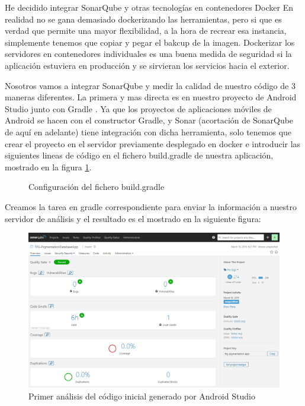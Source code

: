 He decidido integrar SonarQube y otras tecnologías en contenedores Docker \cite{docker} En realidad no se gana demasiado dockerizando las herramientas, pero si que es verdad que permite una mayor flexibilidad, a la hora de recrear esa instancia, simplemente tenemos que copiar y pegar el bakcup de la imagen. Dockerizar los servidores en contenedores individuales es una buena medida de seguridad si la aplicación estuviera en producción y se sirvieran los servicios hacia el exterior. 

Nosotros vamos a integrar SonarQube y medir la calidad de nuestro código de 3 maneras diferentes. La primera y mas directa es en nuestro proyecto de Android Studio junto con Gradle \cite{gradle}. Ya que los proyectos de aplicaciones móviles de Android se hacen con el constructor Gradle, y Sonar (acortación de SonarQube de aquí en adelante) tiene integración con dicha herramienta, solo tenemos que crear el proyecto en el servidor previamente desplegado en docker e introducir las siguientes lineas de código en el fichero build.gradle de nuestra aplicación, mostrado en la figura \ref{fig:buildGradle}.

\begin{figure} \label{fig:buildGradle}

\caption{Configuración del fichero build.gradle}
\end{figure}

Creamos la tarea en gradle correspondiente para enviar la información a nuestro servidor de análisis y el resultado es el mostrado en la siguiente figura: 

\begin{figure}[H]
    \centering
    \includegraphics[scale=0.35]{imagenes/introduccion/sonarqube1.png}
    \caption{Primer análisis del código inicial generado por Android Studio}
    \label{fig:mainSonar}
\end{figure}

